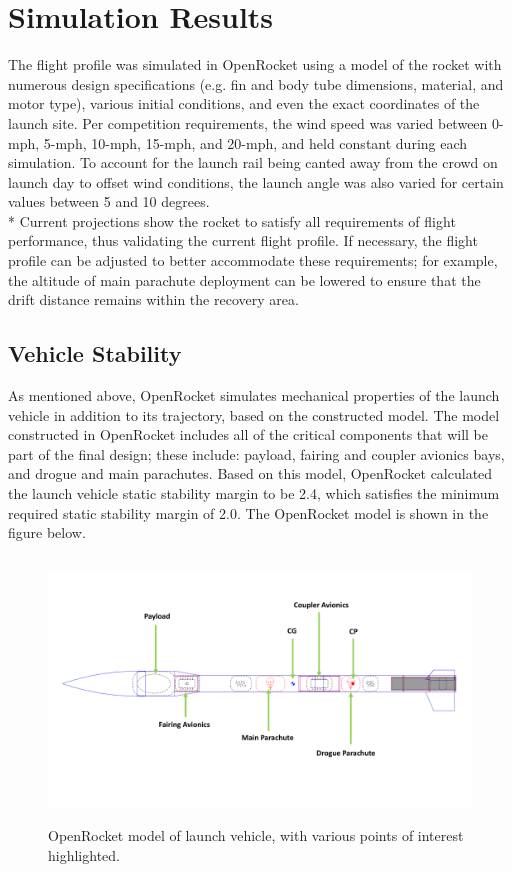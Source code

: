 \section{Simulation Results}
The flight profile was simulated in OpenRocket using a model of the rocket with numerous
design specifications (e.g. fin and body tube dimensions, material, and motor type), various initial
conditions, and even the exact coordinates of the launch site. Per competition requirements, the wind speed was varied between 0-mph, 5-mph, 10-mph, 15-mph, and 20-mph, and held constant during each simulation. To account for the launch rail being canted away from the crowd on launch day to offset wind conditions, the launch angle was also varied for certain values between 5 and 10 degrees. 
\\*
\newline
Current projections show the rocket to satisfy all requirements of flight performance, thus validating the current flight profile. If
necessary, the flight profile can be adjusted to better accommodate these requirements;
for example, the altitude of main parachute deployment can be lowered to ensure that the
drift distance remains within the recovery area.
\subsection{Vehicle Stability}
As mentioned above, OpenRocket simulates mechanical properties of the launch vehicle in addition to its trajectory, based on the constructed model. The model constructed in OpenRocket includes all of the critical components that will be part of the final design; these include: payload, fairing and coupler avionics bays, and drogue and main parachutes. Based on this model, OpenRocket calculated the launch vehicle static stability margin to be 2.4, which satisfies the minimum required static stability margin of 2.0. The OpenRocket model is shown in the figure below.
\begin{figure}[h]
\centering
    \includegraphics[width = 14cm, height = 7cm]{img/FIDO/openrocket_Model.pdf}
    \caption{OpenRocket model of launch vehicle, with various points of interest highlighted.}
    \label{fig:my_label}
\end{figure}   

